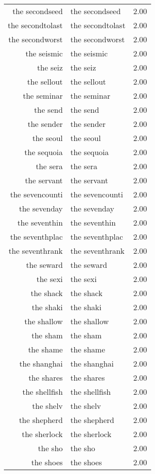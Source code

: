 \begin{table}[ht]
\begin{tabular}{rlr}
  the secondseed & the secondseed & 2.00 \\ 
  the secondtolast & the secondtolast & 2.00 \\ 
  the secondworst & the secondworst & 2.00 \\ 
  the seismic & the seismic & 2.00 \\ 
  the seiz & the seiz & 2.00 \\ 
  the sellout & the sellout & 2.00 \\ 
  the seminar & the seminar & 2.00 \\ 
  the send & the send & 2.00 \\ 
  the sender & the sender & 2.00 \\ 
  the seoul & the seoul & 2.00 \\ 
  the sequoia & the sequoia & 2.00 \\ 
  the sera & the sera & 2.00 \\ 
  the servant & the servant & 2.00 \\ 
  the sevencounti & the sevencounti & 2.00 \\ 
  the sevenday & the sevenday & 2.00 \\ 
  the seventhin & the seventhin & 2.00 \\ 
  the seventhplac & the seventhplac & 2.00 \\ 
  the seventhrank & the seventhrank & 2.00 \\ 
  the seward & the seward & 2.00 \\ 
  the sexi & the sexi & 2.00 \\ 
  the shack & the shack & 2.00 \\ 
  the shaki & the shaki & 2.00 \\ 
  the shallow & the shallow & 2.00 \\ 
  the sham & the sham & 2.00 \\ 
  the shame & the shame & 2.00 \\ 
  the shanghai & the shanghai & 2.00 \\ 
  the shares & the shares & 2.00 \\ 
  the shellfish & the shellfish & 2.00 \\ 
  the shelv & the shelv & 2.00 \\ 
  the shepherd & the shepherd & 2.00 \\ 
  the sherlock & the sherlock & 2.00 \\ 
  the sho & the sho & 2.00 \\ 
  the shoes & the shoes & 2.00 \\ 

\end{tabular}
\end{table}
